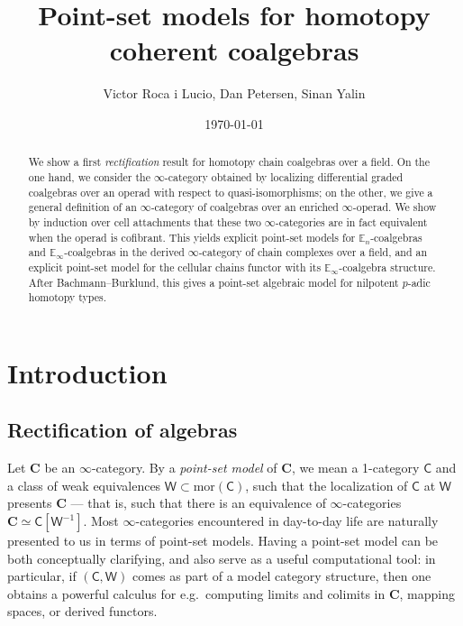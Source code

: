 \documentclass{proc-l}
\title{Point-set models for homotopy coherent coalgebras}
\author{\quad Victor Roca i Lucio, \quad Dan Petersen, \quad Sinan Yalin}
\date{\today}
\theoremstyle{plain}
\theoremstyle{definition}
\theoremstyle{remark}
\begin{document}
\begin{abstract}
We show a first \emph{rectification} result for homotopy chain coalgebras over a field. On the one hand, we consider the $\infty$-category obtained by localizing  differential graded coalgebras over an operad with respect to quasi-isomorphisms; on the other, we give a general definition of an $\infty$-category of coalgebras over an enriched $\infty$-operad. We show by induction over cell attachments that these two $\infty$-categories are in fact equivalent when the operad is cofibrant. This yields explicit point-set models for $\mathbb{E}_n$-coalgebras and $\mathbb{E}_\infty$-coalgebras in the derived $\infty$-category of chain complexes over a field, and an explicit point-set model for the cellular chains functor with its $\mathbb{E}_\infty$-coalgebra structure. After Bachmann--Burklund, this gives a point-set algebraic model for nilpotent $p$-adic homotopy types.
\end{abstract}

\maketitle

\tableofcontents

\section{Introduction}%
\label{Section:1}

\vspace{2pc}

\subsection{Rectification of algebras}%
\label{Section:1.1} Let $\mathbf C$ be an $\infty$-category. By a \emph{point-set model} of $\mathbf C$, we mean a 1-category $\mathsf C$ and a class of weak equivalences $\mathsf W \subset \mathrm{mor}(\mathsf C)$, such that the localization of $\mathsf C$ at $\mathsf W$ presents $\mathbf C$ --- that is, such that there is an equivalence of $\infty$-categories $\mathbf C \simeq \mathsf C[\mathsf W^{-1}]$.
Most $\infty$-categories encountered in day-to-day life are naturally presented to us in terms of point-set models. Having a point-set model can be both conceptually clarifying, and also serve as a useful computational tool: in particular, if $(\mathsf C,\mathsf W)$ comes as part of a model category structure, then one obtains a powerful calculus for e.g.\ computing limits and colimits in $\mathbf C$, mapping spaces, or derived functors.
\end{document}
